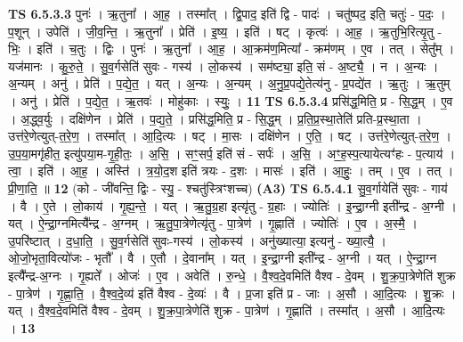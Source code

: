 \documentclass[17pt]{extarticle}
\begin{document}
                  \newline
                                \textbf{ TS 6.5.3.3} \newline
                  पुनः॑ । ऋ॒तुना᳚ । आ॒ह॒ । तस्मा᳚त् । द्वि॒पाद॒ इति॑ द्वि - पादः॑ । चतु॑ष्पद॒ इति॒ चतुः॑ - प॒दः॒ । प॒शून् । उपेति॑ । जी॒व॒न्ति॒ । ऋ॒तुना᳚ । प्रेति॑ । इ॒ष्य॒ । इति॑ । षट् । कृत्वः॑ । आ॒ह॒ । ऋ॒तुभि॒रित्यृ॒तु - भिः॒ । इति॑ । च॒तुः । द्विः । पुनः॑ । ऋ॒तुना᳚ । आ॒ह॒ । आ॒क्रम॑ण॒मित्या᳚ - क्रम॑णम् । ए॒व । तत् । सेतु᳚म् । यज॑मानः । कु॒रु॒ते॒ । सु॒व॒र्गसेति॑ सुवः - गस्य॑ । लो॒कस्य॑ । सम॑ष्ट्या॒ इति॒ सं - अ॒ष्ट्यै॒ । न । अ॒न्यः । अ॒न्यम् । अनु॑ । प्रेति॑ । प॒द्ये॒त॒ । यत् । अ॒न्यः । अ॒न्यम् । अ॒नु॒प्र॒पद्ये॒तेत्य॑नु - प्र॒पद्ये॑त । ऋ॒तुः । ऋ॒तुम् । अनु॑ । प्रेति॑ । प॒द्ये॒त॒ । ऋ॒तवः॑ । मोहु॑काः । स्युः॒ । \textbf{  11} \newline
                  \newline
                                \textbf{ TS 6.5.3.4} \newline
                  प्रसि॑द्ध॒मिति॒ प्र - सि॒द्ध॒म् । ए॒व । अ॒द्ध्व॒र्युः । दक्षि॑णेन । प्रेति॑ । प॒द्य॒ते॒ । प्रसि॑द्ध॒मिति॒ प्र - सि॒द्ध॒म् । प्र॒ति॒प्र॒स्था॒तेति॑ प्रति-प्र॒स्था॒ता । उत्त॑रे॒णेत्युत्-त॒रे॒ण॒ । तस्मा᳚त् । आ॒दि॒त्यः । षट् । मा॒सः । दक्षि॑णेन । ए॒ति॒ । षट् । उत्त॑रे॒णेत्युत्-त॒रे॒ण॒ । उ॒प॒या॒मगृ॑हीत॒ इत्यु॑पया॒म-गृ॒ही॒तः॒ । अ॒सि॒ । सꣳ॒॒सर्प॒ इति॑ सं - सर्पः॑ । अ॒सि॒ । अꣳ॒॒ह॒स्प॒त्यायेत्यꣳ॑हः - प॒त्याय॑ । त्वा॒ । इति॑ । आ॒ह॒ । अस्ति॑ । त्र॒यो॒द॒श इति॑ त्रयः - द॒शः । मासः॑ । इति॑ । आ॒हुः॒ । तम् । ए॒व । तत् । प्री॒णा॒ति॒ ॥ \textbf{  12} \newline
                  \newline
                      (को - जी॑वन्ति॒ द्विः - स्यु॒ - श्चतु॑स्त्रिꣳशच्च)  \textbf{(A3)} \newline \newline
                                \textbf{ TS 6.5.4.1} \newline
                  सु॒व॒र्गायेति॑ सुवः - गाय॑ । वै । ए॒ते । लो॒काय॑ । गृ॒ह्य॒न्ते॒ । यत् । ऋ॒तु॒ग्र॒हा इत्यृ॑तु - ग्र॒हाः । ज्योतिः॑ । इ॒न्द्रा॒ग्नी इती᳚न्द्र - अ॒ग्नी । यत् । ऐ॒न्द्रा॒ग्नमित्यै᳚न्द्र - अ॒ग्नम् । ऋ॒तु॒पा॒त्रेणेत्यृ॑तु - पा॒त्रेण॑ । गृ॒ह्णाति॑ । ज्योतिः॑ । ए॒व । अ॒स्मै॒ । उ॒परि॑ष्टात् । द॒धा॒ति॒ । सु॒व॒र्गसेति॑ सुवः-गस्य॑ । लो॒कस्य॑ । अनु॑ख्यात्या॒ इत्यनु॑ - ख्या॒त्यै॒ । ओ॒जो॒भृता॒वित्यो॑जः - भृतौ᳚ । वै । ए॒तौ । दे॒वाना᳚म् । यत् । इ॒न्द्रा॒ग्नी इती᳚न्द्र - अ॒ग्नी । यत् । ऐ॒न्द्रा॒ग्न इत्यै᳚न्द्र-अ॒ग्नः । गृ॒ह्यते᳚ । ओजः॑ । ए॒व । अवेति॑ । रु॒न्धे॒ । वै॒श्व॒दे॒वमिति॑ वैश्व - दे॒वम् । शु॒क्र॒पा॒त्रेणेति॑ शुक्र - पा॒त्रेण॑ । गृ॒ह्णा॒ति॒ । वै॒श्व॒दे॒व्य॑ इति॑ वैश्व - दे॒व्यः॑ । वै । प्र॒जा इति॑ प्र - जाः । अ॒सौ । आ॒दि॒त्यः । शु॒क्रः । यत् । वै॒श्व॒दे॒वमिति॑ वैश्व - दे॒वम् । शु॒क्र॒पा॒त्रेणेति॑ शुक्र - पा॒त्रेण॑ । गृ॒ह्णाति॑ । तस्मा᳚त् । अ॒सौ । आ॒दि॒त्यः । \textbf{  13} \newline
\end{document}
